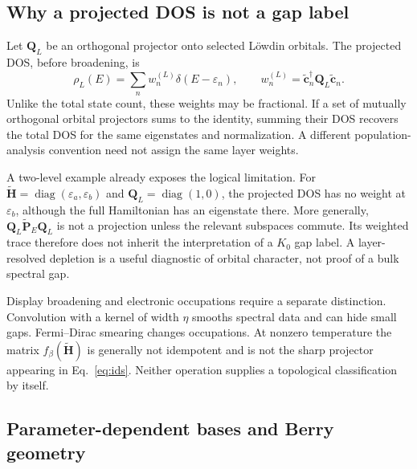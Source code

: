 \documentclass[11pt,a4paper]{article}
\begin{document}
\subsection{Why a projected DOS is not a gap label}

Let $\bm Q_L$ be an orthogonal projector onto selected L\"owdin orbitals. The projected DOS, before broadening, is
\begin{equation}
 \rho_L(E)=\sum_n w_n^{(L)}\delta(E-\varepsilon_n),
 \qquad w_n^{(L)}=\widetilde{\bm c}_n^\dagger\bm Q_L\widetilde{\bm c}_n.
 \label{eq:projecteddos}
\end{equation}
Unlike the total state count, these weights may be fractional. If a set of mutually orthogonal orbital projectors sums to the identity, summing their DOS recovers the total DOS for the same eigenstates and normalization. A different population-analysis convention need not assign the same layer weights.

A two-level example already exposes the logical limitation. For $\widetilde{\bm H}=\operatorname{diag}(\varepsilon_a,\varepsilon_b)$ and $\bm Q_L=\operatorname{diag}(1,0)$, the projected DOS has no weight at $\varepsilon_b$, although the full Hamiltonian has an eigenstate there. More generally, $\bm Q_L\widetilde{\bm P}_E\bm Q_L$ is not a projection unless the relevant subspaces commute. Its weighted trace therefore does not inherit the interpretation of a $K_0$ gap label. A layer-resolved depletion is a useful diagnostic of orbital character, not proof of a bulk spectral gap.

Display broadening and electronic occupations require a separate distinction. Convolution with a kernel of width $\eta$ smooths spectral data and can hide small gaps. Fermi--Dirac smearing changes occupations. At nonzero temperature the matrix $f_\beta(\widetilde{\bm H})$ is generally not idempotent and is not the sharp projector appearing in Eq.~\eqref{eq:ids}. Neither operation supplies a topological classification by itself.

\subsection{Parameter-dependent bases and Berry geometry}
\end{document}
